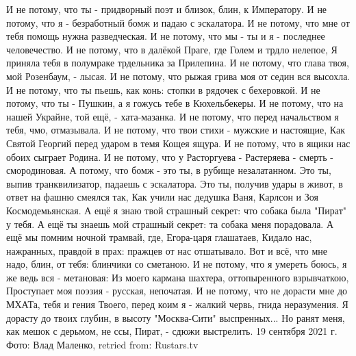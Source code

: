 И не потому, что ты - придворный поэт и близок, блин, к Императору.
И не потому, что я - безработный бомж и падаю с эскалатора.
И не потому, что мне от тебя помощь нужна разведческая.
И не потому, что мы - ты и я - последнее человечество.
И не потому, что в далёкой Праге, где Голем и трдло нелепое,
Я приняла тебя в полумраке трдельника за Прилепина.
И не потому, что глава твоя, мой Розенбаум, - лысая.
И не потому, что рыжая грива моя от седин вся высохла.
И не потому, что ты пьешь, как конь: стопки в рядочек с бехеровкой.
И не потому, что ты - Пушкин, а я гожусь тебе в Кюхельбекеры.
И не потому, что на нашей Украйне, той ещё, - хата-мазанка.
И не потому, что перед начальством я тебя, чмо, отмазывала.
И не потому, что твои стихи - мужские и настоящие,
Как Святой Георгий перед ударом в темя Кощея ящура.
И не потому, что в ящики нас обоих сыграет Родина.
И не потому, что у Расторгуева - Растеряева - смерть - смородиновая.
А потому, что бомж - это ты, в рубище незалатанном.
Это ты, выпив транквилизатор, падаешь с эскалатора.
Это ты, получив удары в живот, в ответ на фашню смеялся так,
Как учили нас дедушка Ваня, Карлсон и Зоя Космодемьянская.
А ещё я знаю твой страшный секрет: что собака была "Пират" у тебя.
А ещё ты знаешь мой страшный секрет: та собака меня порадовала.
А ещё мы помним ночной трамвай, где, Егора-царя глашатаев,
Кидало нас, нажранных, правдой в прах: пражцев от нас отшатывало.
Вот и всё, что мне надо, блин, от тебя: блинчики со сметаною.
И не потому, что я умереть боюсь, я же ведь вся - метановая:
Из моего кармана шахтера, оттопыренного взрывчаткою,
Проступает моя поэзия - русская, непочатая.
И не потому, что не дорасти мне до МХАТа, тебя и гения
Твоего, перед коим я - жалкий червь, гнида неразумения.
Я дорасту до твоих глубин, в высоту "Москва-Сити" выспренных...
Но ранят меня, как мешок с дерьмом, не ссы, Пират, - сдюжи выстрелить.
19 сентября 2021 г.
Фото: Влад Маленко, retried from: Rustars.tv
